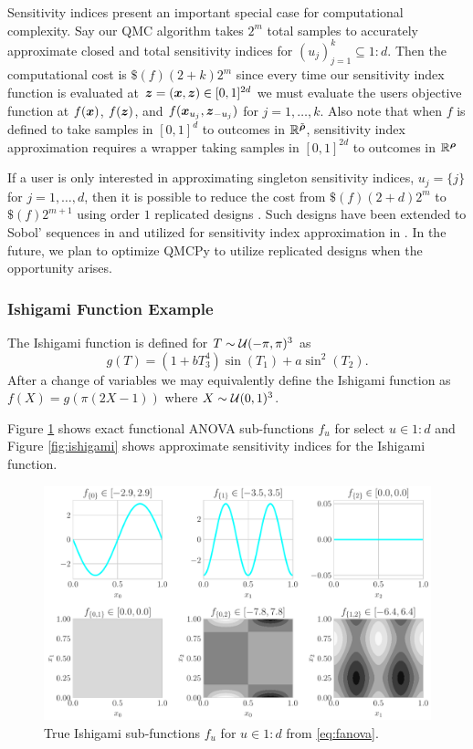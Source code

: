 \documentclass{article}[12pt]
\begin{document}
Sensitivity indices present an important special case for computational complexity. Say our QMC algorithm takes $2^m$ total samples to accurately approximate closed and total sensitivity indices for $(u_j)_{j=1}^k \subseteq 1:d$. Then the computational cost is $\$(f)(2+k)2^m$ since every time our sensitivity index function is evaluated at $\boldsymbol{z} = (\boldsymbol{x},\boldsymbol{z}) \in [0,1]^{2d}$ we must evaluate the users objective function at $f(\boldsymbol{x})$, $f(\boldsymbol{z})$, and $f(\boldsymbol{x}_{u_j},\boldsymbol{z}_{-{u_j}})$ for $j=1,\dots,k$. Also note that when $f$ is defined to take samples in  $[0,1]^d$ to outcomes in $\mathbb{R}^{\tilde{\boldsymbol{\rho}}}$, sensitivity index approximation requires a wrapper taking samples in $[0,1]^{2d}$ to outcomes in $\mathbb{R}^{\boldsymbol{\rho}}$

If a user is only interested in approximating singleton sensitivity indices, $u_j = \{j\}$ for $j=1,\dots,d$, then it is possible to reduce the cost from $\$(f)(2+d)2^m$ to $\$(f)2^{m+1}$ using order $1$ replicated designs \cite{alex2008comparison,tissot2015randomized}. Such designs have been extended to  Sobol' sequences  in \cite{replicated_designs_sobol_seq} and utilized for sensitivity index approximation in \cite{reliable_sobol_indices_approx}. In the future, we plan to optimize QMCPy to utilize replicated designs when the opportunity arises.

\subsubsection{Ishigami Function Example}

The Ishigami function \cite{ishigami1990importance} is defined for $T \sim \mathcal{U}(-\pi,\pi)^3$ as
\begin{equation*}
    g(T) = \left(1+bT_3^4\right)\sin(T_1) + a\sin^2(T_2).
\end{equation*}
After a change of variables we may equivalently define the Ishigami function as 
$f(X) = g\left(\pi(2X-1)\right)$ where $X \sim \mathcal{U}(0,1)^3$. 

Figure \ref{fig:ishigami_fu} shows exact functional ANOVA sub-functions $f_u$ for select $u \in 1:d$ and Figure \ref{fig:ishigami} shows approximate sensitivity indices for the Ishigami function. 

\begin{figure}[H]
    \centering
    \includegraphics[width=.8\textwidth]{figs/ishigami_fu.pdf}
    \caption{True Ishigami sub-functions $f_u$ for $u \in 1:d$ from \eqref{eq:fanova}.}
    \label{fig:ishigami_fu}
\end{figure}
\end{document}
